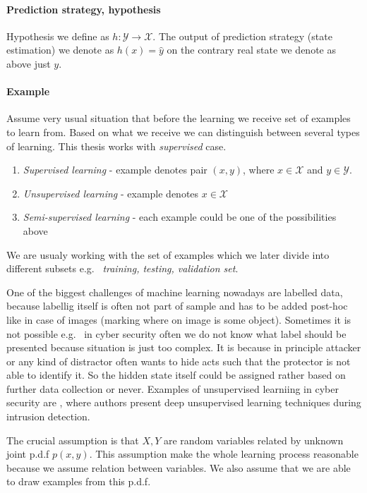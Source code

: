 \paragraph{Prediction strategy, hypothesis}
Hypothesis we define as $h:\mathcal{Y} \rightarrow \mathcal{X}$. The output of prediction strategy (state estimation) we denote as $h(x)=\hat{y}$ on the contrary real state we denote as above just $y$.

\paragraph{Example}
Assume very usual situation that before the learning we receive set of examples to learn from. Based on what we receive we can distinguish between several types of learning. This thesis works with \emph{supervised} case.\
\begin{enumerate}
    \item \emph{Supervised learning} - example denotes pair $(x,y)$, where $x\in \mathcal{X}$ and $y\in \mathcal{Y}$. 
    \item \emph{Unsupervised learning} - example denotes $x\in \mathcal{X}$
    \item \emph{Semi-supervised learning} - each example could be one of the possibilities above
\end{enumerate}
We are usualy working with the set of examples which we later divide into different subsets e.g. \ \emph{training, testing, validation set}. \

One of the biggest challenges of machine learning nowadays are labelled data, because labellig itself is often not part of sample and has to be added post-hoc like in case of images (marking where on image is some object). Sometimes it is not possible e.g. \ in cyber security often we do not know what label should be presented because situation is just too complex. It is because in principle attacker or any kind of distractor often wants to hide acts such that the protector is not able to identify it. So the hidden state itself could be assigned rather based on further data collection or never. Examples of unsupervised learniing in cyber security are \cite{Alom2017}, where authors present deep unsupervised learning techniques during intrusion detection.

The crucial assumption is that $X, Y$ are random variables related by unknown joint p.d.f $p(x,y)$. This assumption make the whole learning process reasonable because we assume relation between variables. We also assume that we are able to draw examples from this p.d.f.

